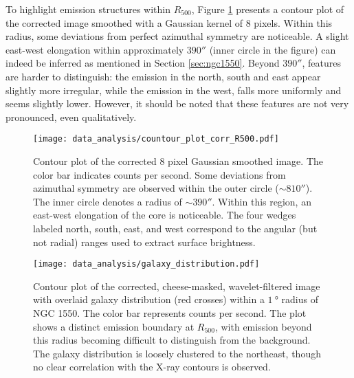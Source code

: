 To highlight emission structures within \(R_{500}\), Figure \ref{fig:contour_fully_corrected} presents a contour plot of the corrected image smoothed with a Gaussian kernel of \(8\) pixels. Within this radius, some deviations from perfect azimuthal symmetry are noticeable. A slight east-west elongation within approximately \(390''\) (inner circle in the figure) can indeed be inferred as mentioned in Section \ref{sec:ngc1550}. Beyond \(390''\), features are harder to distinguish: the emission in the north, south and east appear slightly more irregular, while the emission in the west, falls more uniformly and seems slightly lower. However, it should be noted that these features are not very pronounced, even qualitatively.
\begin{figure}[htbp]
    \centering
    \texttt{[image: data\_analysis/countour\_plot\_corr\_R500.pdf]}
    \caption{Contour plot of the corrected 8 pixel Gaussian smoothed image. The color bar indicates counts per second. Some deviations from azimuthal symmetry are observed within the outer circle (\(\sim 810''\)). The inner circle denotes a radius of \(\sim 390''\). Within this region, an east-west elongation of the core is noticeable. The four wedges labeled north, south, east, and west correspond to the angular (but not radial) ranges used to extract surface brightness.}
    \label{fig:contour_fully_corrected}
\end{figure}
\begin{figure}[htbp]
    \centering
    \texttt{[image: data\_analysis/galaxy\_distribution.pdf]}
    \caption{Contour plot of the corrected, cheese-masked, wavelet-filtered image with overlaid galaxy distribution (red crosses) within a \(\SI{1}{\degree}\) radius of NGC 1550. The color bar represents counts per second. The plot shows a distinct emission boundary at \(R_{500}\), with emission beyond this radius becoming difficult to distinguish from the background. The galaxy distribution is loosely clustered to the northeast, though no clear correlation with the X-ray contours is observed.}
    \label{fig:contour_wvl_filtered}
\end{figure}
